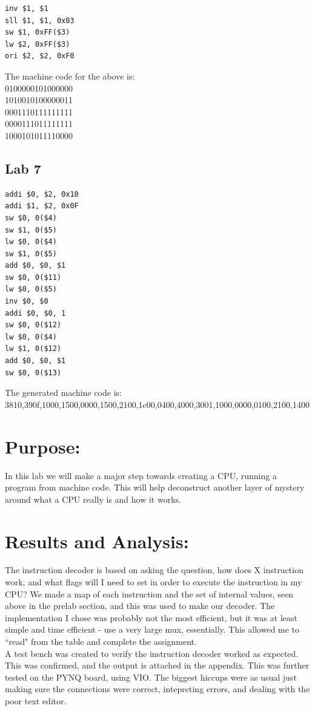\documentclass[12pt,a4paper]{article}
\begin{document}
\begin{lstlisting}
inv $1, $1
sll $1, $1, 0x03
sw $1, 0xFF($3)
lw $2, 0xFF($3)
ori $2, $2, 0xF0
\end{lstlisting}

The machine code for the above is:\\
0100000101000000 \\
1010010100000011 \\
0001110111111111 \\
0000111011111111 \\
1000101011110000

\subsection*{Lab 7}
\begin{lstlisting}
addi $0, $2, 0x10
addi $1, $2, 0x0F
sw $0, 0($4)
sw $1, 0($5)
lw $0, 0($4)
sw $1, 0($5)
add $0, $0, $1
sw $0, 0($11)
lw $0, 0($5)
inv $0, $0
addi $0, $0, 1
sw $0, 0($12)
lw $0, 0($4)
lw $1, 0($12)
add $0, $0, $1
sw $0, 0($13)
\end{lstlisting}

The generated machine code is: \\
3810,390f,1000,1500,0000,1500,2100,1c00,0400,4000,3001,1000,0000,0100,2100,1400
\section*{Purpose:}
In this lab we will make a major step towards creating a CPU, running a program
from machine code. This will help deconstruct another layer of mystery around what
a CPU really is and how it works.

\section*{Results and Analysis:}
The instruction decoder is based on asking the question, how does X instruction
work, and what flags will I need to set in order to execute the instruction in
my CPU? We made a map of each instruction and the set of internal values, seen
above in the prelab section, and this was used to make our decoder. The implementation
I chose was probably not the most efficient, but it was at least simple and time
efficient - use a very large mux, essentially. This allowed me to ``read" from the
table and complete the assignment. \\

A test bench was created to verify the instruction decoder worked as expected.
This was confirmed, and the output is attached in the appendix. This was further
tested on the PYNQ board, using VIO. The biggest hiccups were as usual just making
sure the connections were correct, intepreting errors, and dealing with the poor
text editor. \\
\end{document}
